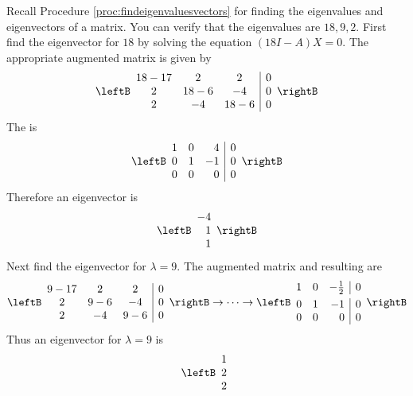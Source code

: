 \begin{solution}
Recall Procedure \ref{proc:findeigenvaluesvectors} for finding the eigenvalues and eigenvectors of a matrix. You can verify that the eigenvalues are $18,9,2.$ First find the eigenvector for $18$ by solving the equation $(18I-A)X = 0$. 
The appropriate augmented matrix is given by  
\begin{equation*}
\leftB
\begin{array}{ccc|c}
18-17 & 2 & 2 & 0 \\ 
2 & 18-6 & -4 & 0 \\ 
2 & -4 & 18-6 & 0
\end{array}
\rightB
\end{equation*}
The {\rref} is 
\begin{equation*}
\leftB
\begin{array}{rrr|r}
1 & 0 & 4 & 0 \\ 
0 & 1 & -1 & 0 \\ 
0 & 0 & 0 & 0
\end{array}
\rightB
\end{equation*}
Therefore an eigenvector is 
\begin{equation*}
\leftB
\begin{array}{r}
-4 \\ 
1 \\ 
1
\end{array}
\rightB
\end{equation*}
Next find the eigenvector for $\lambda =9.$ The augmented matrix and resulting {\rref} are 
\begin{equation*}
\leftB
\begin{array}{ccc|c}
9-17 & 2 & 2 & 0 \\ 
2 & 9-6 & -4 & 0 \\ 
2 & -4 & 9-6 & 0
\end{array}
\rightB
\rightarrow \cdots \rightarrow
\leftB
\begin{array}{rrr|r}
1 & 0 & -\vspace{0.05in}\frac{1}{2} & 0 \\ 
0 & 1 & -1 & 0 \\ 
0 & 0 & 0 & 0
\end{array}
\rightB
\end{equation*}
Thus an eigenvector for $\lambda =9$ is 
\begin{equation*}
\leftB
\begin{array}{r}
1 \\ 
2 \\ 
2
\end{array}

\end{equation*}
\end{solution}
